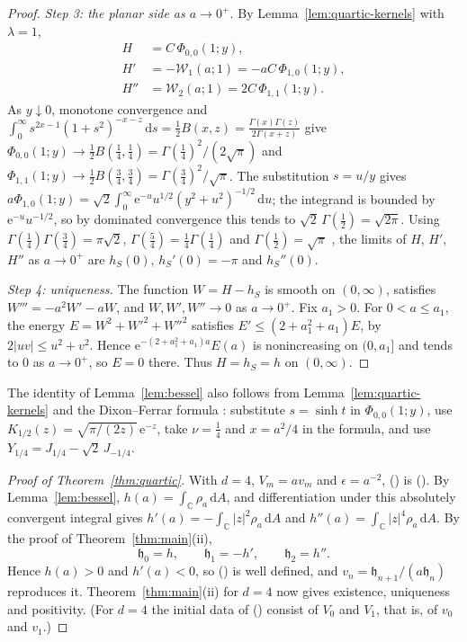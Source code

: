 \documentclass[twoside,10pt]{article}
\numberwithin{equation}{section}
\theoremstyle{slbody}
\theoremstyle{remark}
\newcommand{\C}{\mathbb C}
\newcommand{\dd}{\,\mathrm d}
\newcommand{\e}{\mathrm e}
\newcommand{\fh}{\mathfrak h}
\renewcommand{\eqref}[1]{%
  \textup{{\normalfont(\oldstylenums{\ref{#1}}}\normalfont)}}
\begin{document}
\begin{proof}
\emph{Step 3: the planar side as \(a\to0^+\).}  By
Lemma~\ref{lem:quartic-kernels} with \(\lambda=1\),
\[
\begin{split}
H&=C\,\Phi_{0,0}(1;y),\\
H'&=-\mathcal W_1(a;1)=-aC\,\Phi_{1,0}(1;y),\\
H''&=\mathcal W_2(a;1)=2C\,\Phi_{1,1}(1;y).
\end{split}
\]
As \(y\downarrow0\), monotone convergence and
\(\int_0^\infty s^{2x-1}(1+s^2)^{-x-z}\dd s=\frac12B(x,z)
=\frac{\Gamma(x)\Gamma(z)}{2\Gamma(x+z)}\)
\cite[equations~(5.12.1) and (5.12.3)]{NISTHandbook2010} give
\(\Phi_{0,0}(1;y)\to\frac12B(\frac14,\frac14)=\Gamma(\frac14)^2/(2\sqrt\pi)\)
and \(\Phi_{1,1}(1;y)\to\frac12B(\frac34,\frac34)=\Gamma(\frac34)^2/\sqrt\pi\).
The substitution \(s=u/y\) gives
\(a\Phi_{1,0}(1;y)=\sqrt2\int_0^\infty\e^{-u}u^{1/2}(y^2+u^2)^{-1/2}\dd u\);
the integrand is bounded by \(\e^{-u}u^{-1/2}\), so by dominated
convergence this tends to \(\sqrt2\,\Gamma(\frac12)=\sqrt{2\pi}\).  Using
\(\Gamma(\frac14)\Gamma(\frac34)=\pi\sqrt2\),
\(\Gamma(\frac54)=\frac14\Gamma(\frac14)\) and \(\Gamma(\frac12)=\sqrt\pi\)
\cite[equations~(5.5.3), (5.5.1), (5.4.6)]{NISTHandbook2010}, the limits
of \(H\), \(H'\), \(H''\) as \(a\to0^+\) are \(h_S(0)\),
\(h_S'(0)=-\pi\) and \(h_S''(0)\).

\emph{Step 4: uniqueness.}  The function \(W=H-h_S\) is smooth on
\((0,\infty)\), satisfies \(W'''=-a^2W'-aW\), and \(W,W',W''\to0\) as
\(a\to0^+\).  Fix \(a_1>0\).  For \(0<a\leq a_1\), the energy
\(E=W^2+W'^2+W''^2\) satisfies \(E'\leq(2+a_1^2+a_1)E\), by
\(2|uv|\leq u^2+v^2\).  Hence \(\e^{-(2+a_1^2+a_1)a}E(a)\) is
nonincreasing on \((0,a_1]\) and tends to \(0\) as \(a\to0^+\), so
\(E=0\) there.  Thus \(H=h_S=h\) on \((0,\infty)\).
\end{proof}

The identity of Lemma~\ref{lem:bessel} also follows from
Lemma~\ref{lem:quartic-kernels} and the Dixon--Ferrar formula
\cite[entry~6.518]{GradshteynRyzhik2015}: substitute \(s=\sinh t\) in
\(\Phi_{0,0}(1;y)\), use
\(K_{1/2}(z)=\sqrt{\pi/(2z)}\,\e^{-z}\), take \(\nu=\frac14\) and
\(x=a^2/4\) in the formula, and use
\(Y_{1/4}=J_{1/4}-\sqrt2\,J_{-1/4}\).

\begin{proof}[Proof of Theorem~\ref{thm:quartic}]
With \(d=4\), \(V_m=av_m\) and \(\epsilon=a^{-2}\),
\eqref{eq:FH-recurrence} is \eqref{eq:quartic-recurrence}.  By
Lemma~\ref{lem:bessel}, \(h(a)=\int_\C\rho_a\dd A\), and differentiation
under this absolutely convergent integral gives
\(h'(a)=-\int_\C|z|^2\rho_a\dd A\) and
\(h''(a)=\int_\C|z|^4\rho_a\dd A\).  By the proof of
Theorem~\ref{thm:main}(ii),
\[
\fh_0=h,\qquad \fh_1=-h',\qquad \fh_2=h''.
\]
Hence \(h(a)>0\) and \(h'(a)<0\), so \eqref{eq:initial-values} is well
defined, and \(v_n=\fh_{n+1}/(a\fh_n)\) reproduces it.  Theorem~\ref{thm:main}(ii)
for \(d=4\) now gives existence, uniqueness and positivity.  (For
\(d=4\) the initial data of \eqref{eq:FH-initial} consist of \(V_0\) and
\(V_1\), that is, of \(v_0\) and \(v_1\).)
\end{proof}
\end{document}
